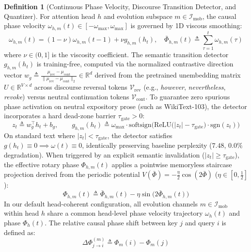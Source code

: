 \documentclass[11pt,a4paper]{article}
\theoremstyle{definition}
\newtheorem{definition}{Definition}
\begin{document}
\begin{definition}[Continuous Phase Velocity, Discourse Transition Detector, and Quantizer]
For attention head $h$ and evolution subspace $m \in \mathcal{I}_{\text{mob}}$, the causal phase velocity $\omega_{h,m}(t) \in [-\omega_{\max}, \omega_{\max}]$ is governed by 1D viscous smoothing:
\begin{equation}
\omega_{h,m}(t) = (1 - \nu)\omega_{h,m}(t-1) + \nu g_{h,m}(h_t), \quad \bar{\Phi}_{h,m}(t) \triangleq \sum_{\tau=1}^t \omega_{h,m}(\tau)
\end{equation}
where $\nu \in (0, 1]$ is the viscosity coefficient. The semantic transition detector $g_{h,m}(h_t)$ is training-free, computed via the normalized contrastive direction vector $w_g \triangleq \frac{\mu_{\text{rev}} - \mu_{\text{cont}}}{\|\mu_{\text{rev}} - \mu_{\text{cont}}\|_2} \in \mathbb{R}^d$ derived from the pretrained unembedding matrix $U \in \mathbb{R}^{V \times d}$ across discourse reversal tokens $\mathcal{V}_{\text{rev}}$ (e.g., \emph{however}, \emph{nevertheless}, \emph{revoke}) versus neutral continuation tokens $\mathcal{V}_{\text{cont}}$. To guarantee zero spurious phase activation on neutral expository prose (such as WikiText-103), the detector incorporates a hard dead-zone barrier $\tau_{\text{gate}} > 0$:
\begin{equation}
z_t \triangleq w_g^\top h_t + b_g, \qquad g_{h,m}(h_t) \triangleq \omega_{\max} \cdot \mathrm{softsign}\Big(\mathrm{ReLU}\big(|z_t| - \tau_{\text{gate}}\big) \cdot \mathrm{sgn}(z_t)\Big)
\end{equation}
On standard text where $|z_t| < \tau_{\text{gate}}$, the detector satisfies $g(h_t) \equiv 0 \implies \omega(t) \equiv 0$, identically preserving baseline perplexity ($7.48$, $0.0\%$ degradation).
When triggered by an explicit semantic invalidation ($|z_t| \ge \tau_{\text{gate}}$), the effective rotary phase $\Phi_{h,m}(t)$ applies a pointwise memoryless staircase projection derived from the periodic potential $V(\bar{\Phi}) = -\frac{\eta}{2}\cos(2\bar{\Phi})$ ($\eta \in [0, \tfrac{1}{2}]$):
\begin{equation}
\Phi_{h,m}(t) \triangleq \bar{\Phi}_{h,m}(t) - \eta\sin\!\big(2\bar{\Phi}_{h,m}(t)\big)
\end{equation}
In our default head-coherent configuration, all evolution channels $m \in \mathcal{I}_{\text{mob}}$ within head $h$ share a common head-level phase velocity trajectory $\omega_h(t)$ and phase $\Phi_h(t)$. The relative causal phase shift between key $j$ and query $i$ is defined as:
\begin{equation}
\Delta\Phi_{j\to i}^{(m)} \triangleq \Phi_m(i) - \Phi_m(j)
\end{equation}
\end{definition}
\end{document}
